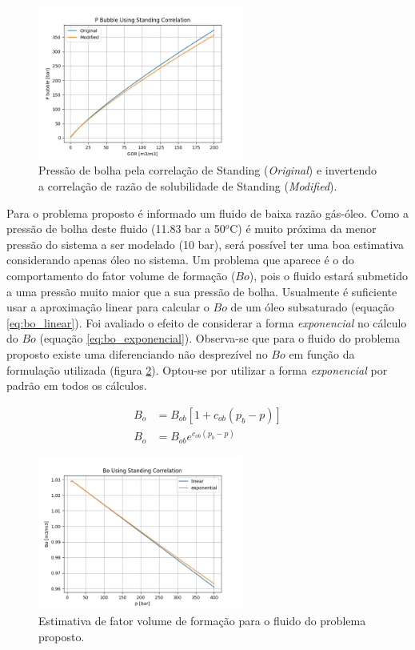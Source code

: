 \documentclass[final,3p]{elsarticle}
\numberwithin{equation}{section}
\begin{document}
        \begin{figure}
            \centering
            \includegraphics[width=0.6\textwidth]{pvt/p_bubble.png}
            \caption{Pressão de bolha pela correlação de Standing (\emph{Original}) e invertendo a correlação de razão de solubilidade de Standing (\emph{Modified}).}
            \label{fig:pb}
        \end{figure}

        Para o problema proposto é informado um fluido de baixa razão gás-óleo. Como a pressão de bolha deste fluido (11.83 bar a 50$^o$C) é muito próxima da menor pressão do sistema a ser modelado (10 bar), será possível ter uma boa estimativa considerando apenas óleo no sistema. Um problema que aparece é o do comportamento do fator volume de formação ($Bo$), pois o fluido estará submetido a uma pressão muito maior que a sua pressão de bolha. Usualmente é suficiente usar a aproximação linear para calcular o $Bo$ de um óleo subsaturado (equação \ref{eq:bo_linear}). Foi avaliado o efeito de considerar a forma \emph{exponencial} no cálculo do $Bo$ (equação \ref{eq:bo_exponencial}). Observa-se que para o fluido do problema proposto existe uma diferenciando não desprezível no $Bo$ em função da formulação utilizada (figura \ref{fig:bo_problema_proposto}). Optou-se por utilizar a forma \emph{exponencial} por padrão em todos os cálculos.

        \begin{align}
          B_o &= B_{ob} [1 + c_{ob}(p_b-p)] \label{eq:bo_linear} \\
          B_o &= B_{ob} e^{c_{ob}(p_b-p)} \label{eq:bo_exponencial}
        \end{align}

        \begin{figure}
            \centering
            \includegraphics[width=0.6\textwidth]{pvt/bo2.png}
            \caption{Estimativa de fator volume de formação para o fluido do problema proposto.}
            \label{fig:bo_problema_proposto}
        \end{figure}
\end{document}
